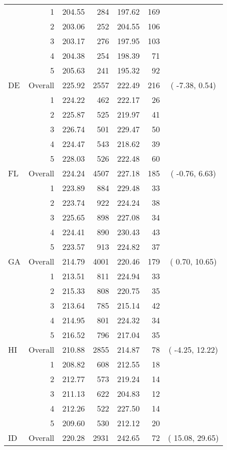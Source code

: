 \begin{longtable}{lrrr@{\extracolsep{.25cm}}rrc}
   & 1 & 204.55 & 284 & 197.62 & 169 &  \\ 
   & 2 & 203.06 & 252 & 204.55 & 106 &  \\ 
   & 3 & 203.17 & 276 & 197.95 & 103 &  \\ 
   & 4 & 204.38 & 254 & 198.39 &  71 &  \\ 
   & 5 & 205.63 & 241 & 195.32 &  92 &  \\ 
   \hline
DE & Overall & 225.92 & 2557 & 222.49 & 216 & ( -7.38,   0.54) \\ 
   & 1 & 224.22 & 462 & 222.17 &  26 &  \\ 
   & 2 & 225.87 & 525 & 219.97 &  41 &  \\ 
   & 3 & 226.74 & 501 & 229.47 &  50 &  \\ 
   & 4 & 224.47 & 543 & 218.62 &  39 &  \\ 
   & 5 & 228.03 & 526 & 222.48 &  60 &  \\ 
   \hline
FL & Overall & 224.24 & 4507 & 227.18 & 185 & ( -0.76,   6.63) \\ 
   & 1 & 223.89 & 884 & 229.48 &  33 &  \\ 
   & 2 & 223.74 & 922 & 224.24 &  38 &  \\ 
   & 3 & 225.65 & 898 & 227.08 &  34 &  \\ 
   & 4 & 224.41 & 890 & 230.43 &  43 &  \\ 
   & 5 & 223.57 & 913 & 224.82 &  37 &  \\ 
   \hline
GA & Overall & 214.79 & 4001 & 220.46 & 179 & (  0.70,  10.65) \\ 
   & 1 & 213.51 & 811 & 224.94 &  33 &  \\ 
   & 2 & 215.33 & 808 & 220.75 &  35 &  \\ 
   & 3 & 213.64 & 785 & 215.14 &  42 &  \\ 
   & 4 & 214.95 & 801 & 224.32 &  34 &  \\ 
   & 5 & 216.52 & 796 & 217.04 &  35 &  \\ 
   \hline
HI & Overall & 210.88 & 2855 & 214.87 &  78 & ( -4.25,  12.22) \\ 
   & 1 & 208.82 & 608 & 212.55 &  18 &  \\ 
   & 2 & 212.77 & 573 & 219.24 &  14 &  \\ 
   & 3 & 211.13 & 622 & 204.83 &  12 &  \\ 
   & 4 & 212.26 & 522 & 227.50 &  14 &  \\ 
   & 5 & 209.60 & 530 & 212.12 &  20 &  \\ 
   \hline
ID & Overall & 220.28 & 2931 & 242.65 &  72 & ( 15.08,  29.65) \\ 

\end{longtable}
